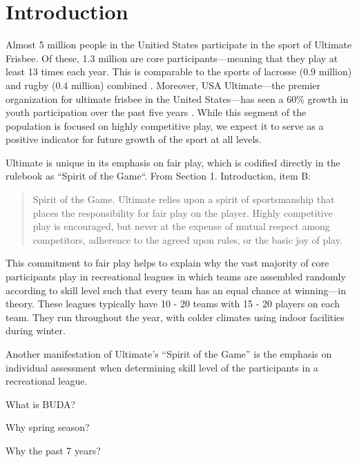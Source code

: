 \section{Introduction}

Almost 5 million people in the Unitied States participate in the sport of Ultimate Frisbee.  Of these, 1.3 million are core participants---meaning that they play at least 13 times each year.  This is comparable to the sports of lacrosse (0.9 million) and rugby (0.4 million) combined \cite{sfia_2016}. Moreover, USA Ultimate---the premier organization for ultimate frisbee in the United States---has seen a 60\% growth in youth participation over the past five years \cite{usau_2016}.  While this segment of the population is focused on highly competitive play, we expect it to serve as a positive indicator for future growth of the sport at all levels.

Ultimate is unique in its emphasis on fair play, which is codified directly in the rulebook as ``Spirit of the Game``.  From Section 1. Introduction, item B:

\begin{quote} Spirit of the Game. Ultimate relies upon a spirit of sportsmanship that places the responsibility for fair play on the player. Highly competitive play is encouraged, but never at the expense of mutual respect among competitors, adherence to the agreed upon rules, or the basic joy of play.
\end{quote}

This commitment to fair play helps to explain why the vast majority of core participants play in recreational leagues in which teams are assembled randomly according to skill level such that every team has an equal chance at winning---in theory.  These leagues typically have 10 - 20 teams with 15 - 20 players on each team.  They run throughout the year, with colder climates using indoor facilities during winter.

Another manifestation of Ultimate's ``Spirit of the Game'' is the emphasis on individual assessment when determining skill level of the participants in a recreational league.  

What is BUDA?

Why spring season?

Why the past 7 years?